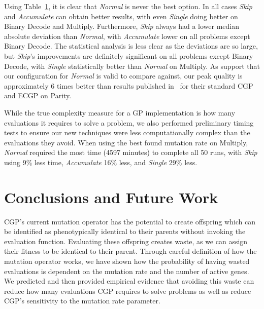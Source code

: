\documentclass[runningheads,a4paper]{llncs}
\begin{document}
\begin{table}
\begin{tabular}{r|c|c|c|c|c|c|c|c|c|c|c|}
  \end{tabular}
  \label{table:results}
\end{table}

Using Table~\ref{table:results}, it is clear that \emph{Normal} is never the best option.
In all cases \emph{Skip} and \emph{Accumulate} can obtain better results,
with even \emph{Single} doing better on Binary Decode and Multiply.  Furthermore, \emph{Skip} always
had a lower median absolute deviation than \emph{Normal}, with \emph{Accumulate} lower
on all problems except Binary Decode.  The statistical analysis is less clear as the deviations
are so large, but \emph{Skip}'s improvements are definitely significant on all problems except
Binary Decode, with \emph{Single} statistically better than \emph{Normal} on Multiply.
As support that our configuration
for \emph{Normal} is valid to compare against, our peak quality is approximately 6 times
better than results published in~\cite{walker:2008:cgpmodules} for their standard CGP and ECGP
on Parity.

While the true complexity measure for a GP implementation is how many evaluations
it requires to solve a problem, we also performed preliminary timing tests to ensure
our new techniques were less computationally complex than the evaluations they avoid.
When using the best found mutation rate on Multiply, \emph{Normal} required the most time (4597 minutes)
to complete all 50 runs, with \emph{Skip} using 9\% less time, \emph{Accumulate} 16\% less,
and \emph{Single} 29\% less.

\section{Conclusions and Future Work}
CGP's current mutation operator has the potential to create offspring which can
be identified as phenotypically identical to their parents without invoking
the evaluation function.  Evaluating these offspring creates waste, as we can
assign their fitness to be identical to their parent.  Through careful definition
of how the mutation operator works, we have shown how the probability of having
wasted evaluations is dependent on the mutation rate and the number of active genes.
We predicted and then provided empirical evidence that avoiding this waste can
reduce how many evaluations CGP requires to solve problems as well as reduce
CGP's sensitivity to the mutation rate parameter.
\end{document}
